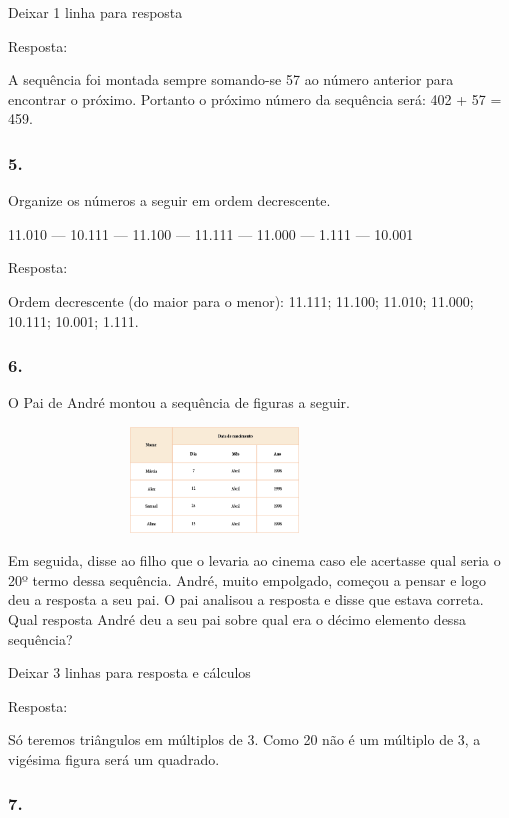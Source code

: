 \begin{enumerate}
\begin{escolha}
\begin{enumerate}
Deixar 1 linha para resposta

Resposta:

A sequência foi montada sempre somando-se 57 ao número anterior para
encontrar o próximo. Portanto o próximo número da sequência será: 402 +
57 = 459.

\subsubsection{5.}\label{section-30}

Organize os números a seguir em ordem decrescente.

11.010 --- 10.111 --- 11.100 --- 11.111 --- 11.000 --- 1.111 --- 10.001

Resposta:

Ordem decrescente (do maior para o menor):
11.111; 11.100; 11.010; 11.000; 10.111; 10.001; 1.111.

\subsubsection{6.}\label{section-31}

O Pai de André montou a sequência de figuras a seguir.

\includegraphics[width=4.30871in,height=1.10010in]{media/image45.png}

Em seguida, disse ao filho que o levaria ao cinema caso ele acertasse
qual seria o 20º termo dessa sequência. André, muito empolgado, começou a
pensar e logo deu a resposta a seu pai. O pai analisou a resposta e
disse que estava correta. Qual resposta André deu a seu pai sobre qual era o décimo elemento
dessa sequência?

Deixar 3 linhas para resposta e cálculos

Resposta:

Só teremos triângulos em múltiplos de 3. Como 20 não é um
múltiplo de 3, a vigésima figura será um quadrado.


\subsubsection{7.}\label{section-32}


\end{enumerate}
\end{escolha}
\end{enumerate}
